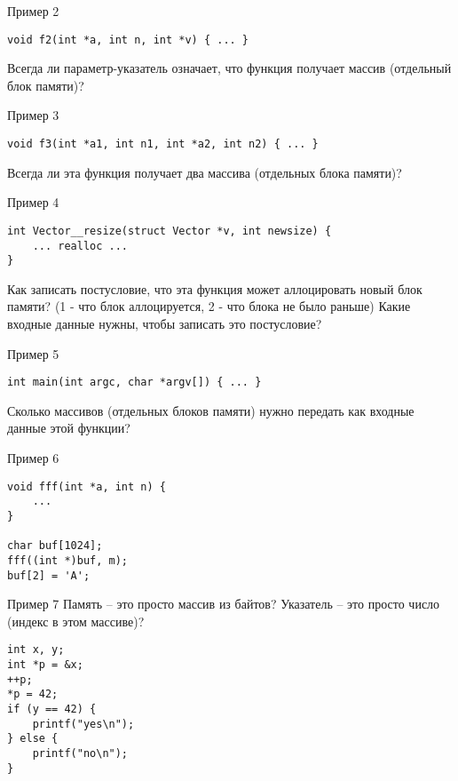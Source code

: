 \documentclass[hyperref={unicode=true}]{beamer}
\begin{document}
    \begin{frame}[fragile]{Пример 2}
    \begin{lstlisting}
void f2(int *a, int n, int *v) { ... }
    \end{lstlisting}
    Всегда ли параметр-указатель означает, что функция
    получает массив (отдельный блок памяти)?
    \end{frame}

    \begin{frame}[fragile]{Пример 3}
    \begin{lstlisting}
void f3(int *a1, int n1, int *a2, int n2) { ... }
    \end{lstlisting}
    Всегда ли эта функция получает два массива
    (отдельных блока памяти)?
    \end{frame}

    \begin{frame}[fragile]{Пример 4}
    \begin{lstlisting}
int Vector__resize(struct Vector *v, int newsize) {
    ... realloc ...
}
    \end{lstlisting}
    Как записать постусловие, что эта функция может
    аллоцировать новый блок памяти? (1 - что блок
    аллоцируется, 2 - что блока не было раньше)
    Какие входные данные нужны, чтобы записать это
    постусловие?
    \end{frame}

    \begin{frame}[fragile]{Пример 5}
    \begin{lstlisting}
int main(int argc, char *argv[]) { ... }
    \end{lstlisting}
    Сколько массивов (отдельных блоков памяти) нужно
    передать как входные данные этой функции?
    \end{frame}

    \begin{frame}[fragile]{Пример 6}
    \begin{lstlisting}
void fff(int *a, int n) {
    ...
}

char buf[1024];
fff((int *)buf, m);
buf[2] = 'A';
    \end{lstlisting}
    \end{frame}

    \begin{frame}[fragile]{Пример 7}
    Память -- это просто массив из байтов?
    Указатель -- это просто число (индекс
    в этом массиве)?

    \begin{lstlisting}
int x, y;
int *p = &x;
++p;
*p = 42;
if (y == 42) {
    printf("yes\n");
} else {
    printf("no\n");
}
    \end{lstlisting}
    \end{frame}
\end{document}
